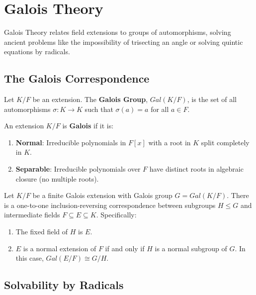 \documentclass[oneside]{book}
\begin{document}
\section{Galois Theory}

Galois Theory relates field extensions to groups of automorphisms, solving ancient problems like the impossibility of trisecting an angle or solving quintic equations by radicals.

\subsection{The Galois Correspondence}

\begin{definition}
Let $K/F$ be an extension. The \textbf{Galois Group}, $Gal(K/F)$, is the set of all automorphisms $\sigma: K \to K$ such that $\sigma(a) = a$ for all $a \in F$.
\end{definition}

\begin{definition}
An extension $K/F$ is \textbf{Galois} if it is:
\begin{enumerate}
    \item \textbf{Normal}: Irreducible polynomials in $F[x]$ with a root in $K$ split completely in $K$.
    \item \textbf{Separable}: Irreducible polynomials over $F$ have distinct roots in algebraic closure (no multiple roots).
\end{enumerate}
\end{definition}

\begin{theorem}
Let $K/F$ be a finite Galois extension with Galois group $G = Gal(K/F)$. There is a one-to-one inclusion-reversing correspondence between subgroups $H \leq G$ and intermediate fields $F \subseteq E \subseteq K$.
Specifically:
\begin{enumerate}
    \item The fixed field of $H$ is $E$.
    \item $E$ is a normal extension of $F$ if and only if $H$ is a normal subgroup of $G$. In this case, $Gal(E/F) \cong G/H$.
\end{enumerate}
\end{theorem}

\subsection{Solvability by Radicals}
\end{document}
